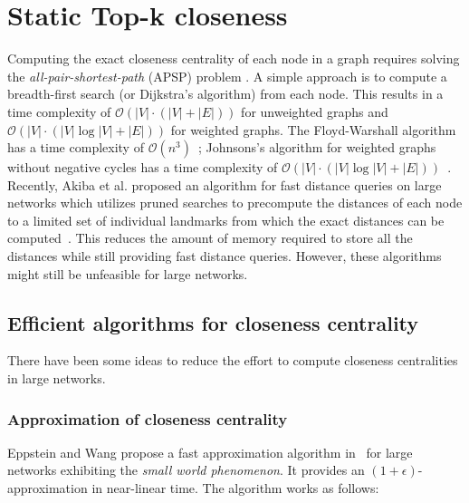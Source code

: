 \chapter{Static Top-k closeness}
\label{ch:staticCloseness}

Computing the exact closeness centrality of each node in a graph requires solving the \emph{all-pair-shortest-path} (APSP) problem . A simple approach is to compute a breadth-first search (or Dijkstra's algorithm) from each node. This results in a time complexity of $\mathcal{O}(|V| \cdot (|V| + |E|))$ for unweighted graphs and $\mathcal{O}(|V| \cdot (|V|\log{|V|} + |E|))$ for weighted graphs. The Floyd-Warshall algorithm has a time complexity of $\mathcal{O}(n^3)$~\cite{Floyd:1962:A9S:367766.368168}; Johnsons's algorithm for weighted graphs without negative cycles has a time complexity of $\mathcal{O}(|V| \cdot (|V|\log{|V|} + |E|))$~\cite{Johnson:1977:EAS:321992.321993}. Recently, Akiba et al. proposed an algorithm for fast distance queries on large networks which utilizes pruned searches to precompute the distances of each node to a limited set of individual landmarks from which the exact distances can be computed~\cite{akiba2013fast}. This reduces the amount of memory required to store all the distances while still providing fast distance queries. However, these algorithms might still be unfeasible for large networks.

\section{Efficient algorithms for closeness centrality}
\label{sec:closenessAlgorithms}

There have been some ideas to reduce the effort to compute closeness centralities in large networks.

\subsection{Approximation of closeness centrality}
Eppstein and Wang propose a fast approximation algorithm in~\cite{eppstein2001fast} for large networks exhibiting the \emph{small world phenomenon}. It provides an $(1 + \epsilon)$-approximation in near-linear time. The algorithm works as follows:

